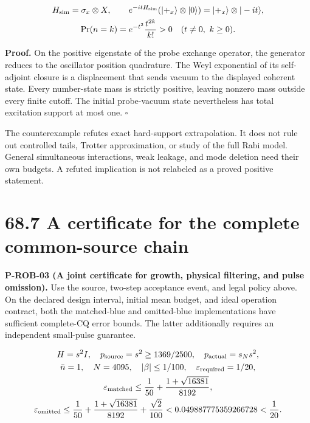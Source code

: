 \documentclass[
  11pt,
  oneside]{book}
\begin{document}
\[
\begin{gathered}
H_{\rm sim}=\sigma_x\otimes X,\qquad
e^{-itH_{\rm sim}}(|+_x\rangle\otimes|0\rangle)
=|+_x\rangle\otimes|-it\rangle,\\
\Pr(n=k)=e^{-t^2}\frac{t^{2k}}{k!}>0\quad(t\ne0,\ k\ge0).
\end{gathered}
\]

\textbf{Proof.} On the positive eigenstate of the probe exchange
operator, the generator reduces to the oscillator position quadrature.
The Weyl exponential of its self-adjoint closure is a displacement that
sends vacuum to the displayed coherent state. Every number-state mass is
strictly positive, leaving nonzero mass outside every finite cutoff. The
initial probe-vacuum state nevertheless has total excitation support at
most one. \(\square\)

The counterexample refutes exact hard-support extrapolation. It does not
rule out controlled tails, Trotter approximation, or study of the full
Rabi model. General simultaneous interactions, weak leakage, and mode
deletion need their own budgets. A refuted implication is not relabeled
as a proved positive statement.

\section{68.7 A certificate for the complete common-source chain}

\label{p-rob-03}{}

\textbf{P-ROB-03 (A joint certificate for growth, physical filtering,
and pulse omission).} Use the source, two-step acceptance event, and
legal policy above. On the declared design interval, initial mean
budget, and ideal operation contract, both the matched-blue and
omitted-blue implementations have sufficient complete-CQ error bounds.
The latter additionally requires an independent small-pulse guarantee.

\[
\begin{gathered}
H=s^2I,\quad p_{\rm source}=s^2\ge1369/2500,\quad
p_{\rm actual}=s_Ns^2,\\
\bar n=1,\quad N=4095,\quad |\beta|\le1/100,\quad
\varepsilon_{\rm required}=1/20,\\
\varepsilon_{\rm matched}\le\frac1{50}+\frac{1+\sqrt{16381}}{8192},\\
\varepsilon_{\rm omitted}\le\frac1{50}+\frac{1+\sqrt{16381}}{8192}
+\frac{\sqrt2}{100}
<0.049887775359266728<\frac1{20}.
\end{gathered}
\]
\end{document}
